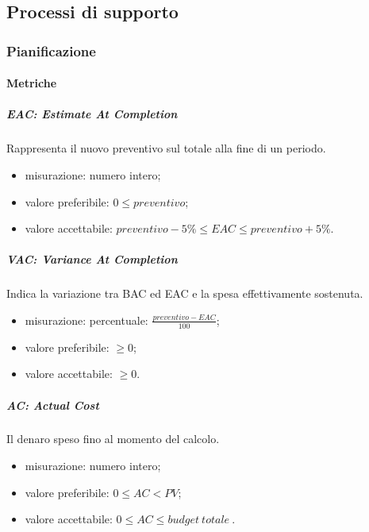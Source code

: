 \subsection{Processi di supporto}
	\subsubsection{Pianificazione}
		\paragraph{Metriche}
			\begin{comment}
			\subparagraph{BAC: Budget At Completion}
			Budget totale allocato per il progetto. Detto anche preventivo.
			\begin{itemize}
			\item misurazione: numero intero;
			\item valore preferibile: $15132 euro$;
			\item valore accettabile: il valore del preventivo con un errore massimo del 5\%, equivale a dire $preventivo -5\% \leq BAC \leq preventivo + 5\%$. 
			\end{itemize}
			\end{comment}
			
			\subparagraph{EAC: Estimate At Completion}
			Rappresenta il nuovo preventivo sul totale alla fine di un periodo.
			\begin{itemize}
				\item  misurazione: numero intero;
				\item  valore preferibile: $0 \leq preventivo$;
				\item  valore accettabile: $ preventivo -5\% \leq EAC \leq preventivo + 5\%$. 
			\end{itemize}
			
			\subparagraph{VAC: Variance At Completion}
			Indica la variazione tra BAC ed EAC e la spesa effettivamente sostenuta.
			\begin{itemize}
				\item  misurazione: percentuale: $\frac{preventivo - EAC}{100}$;
				\item  valore preferibile: $\geq 0$;
				\item  valore accettabile: $\geq 0$.
			\end{itemize}
				
			\subparagraph{AC: Actual Cost}
			Il denaro speso fino al momento del calcolo.
			\begin{itemize}
				\item  misurazione: numero intero;
				\item  valore preferibile: $0 \leq AC < PV$;
				\item  valore accettabile: $0 \leq AC \leq budget\ totale\ $.
			\end{itemize}
		
